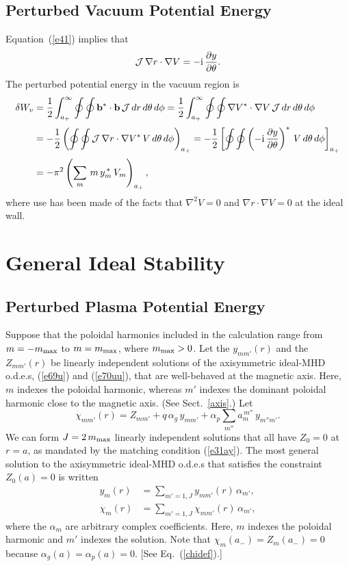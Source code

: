\documentclass[12pt,prb,aps]{revtex4-1}
\begin{document}
\subsection{Perturbed Vacuum Potential Energy}
Equation~(\ref{e41}) implies that 
\begin{equation}
{\cal J} \,\nabla r\cdot\nabla V = - {\rm i}\,\frac{\partial y}{\partial \theta}.
\end{equation}
The perturbed potential energy in the vacuum region is\,\cite{tj1,gs1}
\begin{align}
\delta W_v &= \frac{1}{2}\int_{a_+}^\infty \oint\oint {\bf b}^\ast\cdot{\bf b}\,{\cal J}\,dr\,d\theta\,d\phi
=\frac{1}{2}\int_{a_+}^\infty \oint\oint \nabla V^\ast\cdot\nabla V\,{\cal J}\,dr\,d\theta\,d\phi\nonumber\\[0.5ex]
&= -\frac{1}{2}\left(\oint\oint {\cal J}\,\nabla r\cdot\nabla V^\ast\,V\,d\theta\,d\phi\right)_{a_+}
=-\frac{1}{2}\left[\oint\oint \left(-{\rm i}\,\frac{\partial y}{\partial \theta}\right)^\ast\,V\,d\theta\,d\phi\right]_{a_+}\nonumber\\[0.5ex]
&= - \pi^2\left(\sum_m\,m\,y_m^{\,\ast}\,V_m\right)_{a_+},\label{vac}
\end{align}
where use has been made of the facts that $\nabla^2 V =0$ and $\nabla r\cdot \nabla V=0$ at the ideal wall. 

\section{General Ideal Stability}\label{ideal}

\subsection{Perturbed Plasma Potential Energy}\label{ideal1}
Suppose that the poloidal harmonics included in the calculation range from $m=-m_{\rm max}$ to $m=m_{\rm max}$, where $m_{\rm max} >0$. 
Let  the $y_{mm'}(r)$ and the $Z_{mm'}(r)$ be linearly independent solutions of the axisymmetric ideal-MHD o.d.e.s, (\ref{e69u}) and
(\ref{e70uu}), that are well-behaved at the magnetic axis. Here, $m$ indexes the poloidal harmonic, whereas $m'$ indexes the dominant poloidal harmonic close to the magnetic
axis. (See Sect.~\ref{axis}.)
Let 
\begin{equation}
\chi_{mm'}(r)=Z_{mm'} + q\,\alpha_g\,y_{mm'} + \alpha_p\sum_{m''} a_m^{\,m''}\,y_{m''m'}.
\end{equation}
We can form $J=2\,m_{\rm max}$ linearly independent solutions that all have $Z_0=0$ at $r=a$, as mandated by the matching condition (\ref{e31ay}). 
The most general solution to the axisymmetric ideal-MHD o.d.e.s that satisfies the constraint $Z_0(a)=0$ is written
\begin{align}
y_m(r) &= \sum_{m'=1,J} y_{mm'}(r)\,\alpha_{m'},\\[0.5ex]
\chi_m(r)&= \sum_{m'=1,J} \chi_{mm'}(r)\,\alpha_{m'},
\end{align}
where the $\alpha_m$ are arbitrary complex coefficients. Here, $m$ indexes the poloidal harmonic and $m'$ indexes the solution. 
 Note that
$ \chi_m(a_-)=Z_m(a_-)=0$ because $\alpha_g(a)=\alpha_p(a)=0$. [See Eq.~(\ref{chidef}).]
\end{document}
